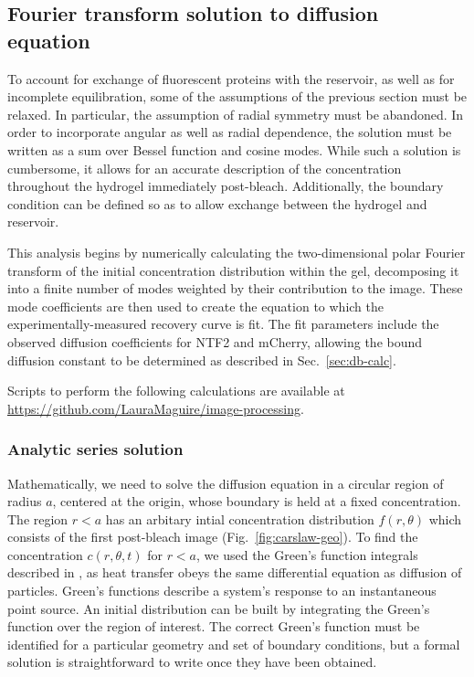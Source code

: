 \subsection{Fourier transform solution to diffusion equation}

To account for exchange of fluorescent proteins with the reservoir, as well as for incomplete equilibration, some of the assumptions of the previous section must be relaxed.  In particular, the assumption of radial symmetry must be abandoned.  In order to incorporate angular as well as radial dependence, the solution must be written as a sum over Bessel function and cosine modes.  While such a solution is cumbersome, it allows for an accurate description of the concentration throughout the hydrogel immediately post-bleach.  Additionally, the boundary condition can be defined so as to allow exchange between the hydrogel and reservoir.

This analysis begins by numerically calculating the two-dimensional polar Fourier transform of the initial concentration distribution within the gel, decomposing it into a finite number of modes weighted by their contribution to the image.  These mode coefficients are then used to create the equation to which the experimentally-measured recovery curve is fit.  The fit parameters include the observed diffusion coefficients for NTF2 and mCherry, allowing the bound diffusion constant to be determined as described in Sec.~\ref{sec:db-calc}.

Scripts to perform the following calculations are available at \url{https://github.com/LauraMaguire/image-processing}.

\subsubsection{Analytic series solution}

Mathematically, we need to solve the diffusion equation in a circular region of radius $a$, centered at the origin, whose boundary is held at a fixed concentration.  The region $r<a$ has an arbitary intial concentration distribution $f(r,\theta)$ which consists of the first post-bleach image (Fig.~\ref{fig:carslaw-geo}).  To find the concentration $c(r,\theta,t)$ for $r<a$, we used the Green's function integrals described in \cite{h.s.carslaw59}, as heat transfer obeys the same differential equation as diffusion of particles.  Green's functions describe a system's response to an instantaneous point source.  An initial distribution can be built by integrating the Green's function over the region of interest.  The correct Green's function must be identified for a particular geometry and set of boundary conditions, but a formal solution is straightforward to write once they have been obtained.

